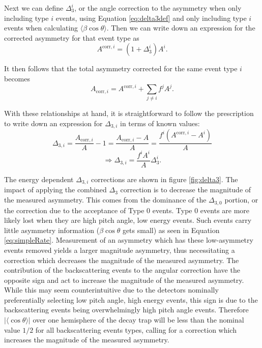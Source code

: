 Next we can define $\Delta^i_3$, or the angle correction to the asymmetry when only
including type $i$ events, using Equation \ref{eq:delta3def} and only including
type $i$ events when calculating $\langle\beta\cos\theta\rangle$. Then we can write down
an expression for the corrected asymmetry for that event type as
%
\begin{equation}
A^{\mathrm{corr},i} = (1+\Delta^i_3)A^i.
\end{equation}

It then follows that the total asymmetry corrected for the same event type $i$ becomes
%
\begin{equation}
A_{\mathrm{corr},i} = A^{\mathrm{corr},i} + \sum_{j\neq i} f^jA^j.
\end{equation}

With these relationships at hand, it is straightforward to follow the prescription to write
down an expression for $\Delta_{3,i}$ in terms of known values:
%
\begin{equation*}
  \Delta_{3,i} = \frac{A_{\mathrm{corr},i}}{A} - 1 = \frac{A_{\mathrm{corr},i}-A}{A} =
  \frac{f^i(A^{\mathrm{corr},i}-A^i)}{A}
\end{equation*}
%
\begin{equation}
  \Rightarrow\Delta_{3,i} = \frac{f^iA^i}{A}\Delta^i_3.
\end{equation}
%

The energy dependent $\Delta_{3,i}$ corrections are shown in figure \ref{fig:delta3}.
The impact of applying the combined $\Delta_{3}$ correction is to decrease the magnitude of the
measured asymmetry. This comes from the dominance of the $\Delta_{3,0}$ portion, or the correction
due to the acceptance of Type 0 events. Type 0 events are more likely lost when they are high pitch
angle, low energy events. Such events carry little asymmetry information ($\beta\cos\theta$ gets small)
as seen in Equation \ref{eq:simpleRate}. Measurement of an asymmetry which has these low-asymmetry events
removed yields a larger magnitude asymmetry, thus necessitating a correction which decreases the
magnitude of the measured asymmetry. The contribution of the backscattering events to the angular
correction have the opposite sign and act to increase the magnitude of the measured asymmetry.
While this may seem counterintuitive due to the detectors nominally preferentially selecting
low pitch angle, high energy events, this sign is due to the backscattering events being overwhelmingly
high pitch angle events. Therefore $|\langle\cos\theta\rangle|$ over one hemisphere of the decay trap
will be less than the nominal value $1/2$ for all
backscattering events types, calling for a correction which increases the magnitude of the measured
asymmetry.

